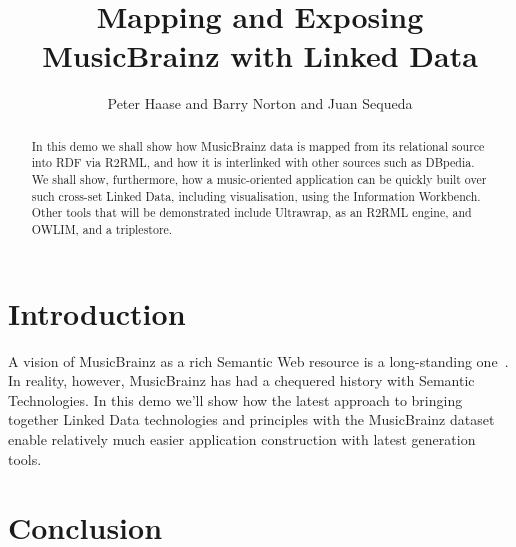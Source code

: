 \documentclass{llncs}
\begin{document}
\title{Mapping and Exposing MusicBrainz with Linked Data}

\author{Peter Haase and Barry Norton and Juan Sequeda}


\maketitle

\begin{abstract}
In this demo we shall show how MusicBrainz data is mapped from its
relational source into RDF via R2RML, and how it is interlinked with
other sources such as DBpedia. We shall show, furthermore, how a
music-oriented application can be quickly built over such cross-set
Linked Data, including visualisation, using the Information
Workbench. Other tools that will be demonstrated include Ultrawrap, as
an R2RML engine, and OWLIM, and a triplestore.
\end{abstract}

\section{Introduction}\label{sec:Introduction}
A vision of MusicBrainz as a rich Semantic Web resource is a
long-standing one~\cite{DBLP:journals/expert/Swartz02}. In reality,
however, MusicBrainz has had a chequered history with Semantic
Technologies. In this demo we'll show how the latest approach to
bringing together Linked Data technologies and principles with the
MusicBrainz dataset enable relatively much easier application
construction with latest generation tools.

\section{Conclusion}\label{sec:Conclusion}



\end{document}
